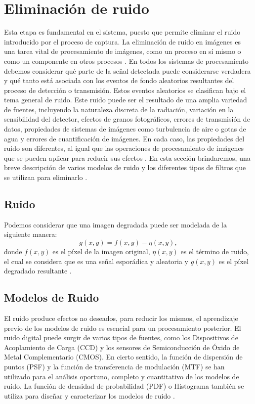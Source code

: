 \section{Eliminación de ruido}

Esta etapa es fundamental en el sistema, puesto que permite eliminar el ruido introducido por el proceso de captura. La eliminación de ruido en imágenes es una tarea vital de procesamiento de imágenes, como un proceso en sí mismo o como un componente en otros procesos \cite{PawanManojSumitAshok}. En todos los sistemas de procesamiento debemos considerar qué parte de la señal detectada puede considerarse verdadera y qué tanto está asociada con los eventos de fondo aleatorios resultantes del proceso de detección o transmisión. Estos eventos aleatorios se clasifican bajo el tema general de ruido. Este ruido puede ser el resultado de una amplia variedad de fuentes, incluyendo la naturaleza discreta de la radiación, variación en la sensibilidad del detector, efectos de granos fotográficos, errores de transmisión de datos, propiedades de sistemas de imágenes como turbulencia de aire o gotas de agua y errores de cuantificación de imágenes. En cada caso, las propiedades del ruido son diferentes, al igual que las operaciones de procesamiento de imágenes que se pueden aplicar para reducir sus efectos \cite{topic5}. En esta sección brindaremos, una breve descripción de varios modelos de ruido \cite{AjayBrijendra} y los diferentes tipos de filtros que se utilizan para eliminarlo \cite{MandarMeghana, PawanManojSumitAshok}.

\subsection{Ruido}

Podemos considerar que una imagen degradada puede ser modelada de la siguiente manera:
$$g(x, y) = f(x, y) - \eta(x, y),$$
donde $f(x, y)$ es el píxel de la imagen original, $\eta(x, y)$ es el término de ruido, el cual se considera que es una señal esporádica y aleatoria y $g(x, y)$ es el píxel degradado resultante \cite{MandarMeghana}.

\subsection{Modelos de Ruido}

El ruido produce efectos no deseados, para reducir los mismos, el aprendizaje previo de los modelos de ruido es esencial para un procesamiento posterior. El ruido digital puede surgir de varios tipos de fuentes, como los Dispositivos de Acoplamiento de Carga (CCD) y los sensores de Semiconducción de Óxido de Metal Complementario (CMOS). En cierto sentido, la función de dispersión de puntos (PSF) y la función de transferencia de modulación (MTF) se han utilizado para el análisis oportuno, completo y cuantitativo de los modelos de ruido. La función de densidad de probabilidad (PDF) o Histograma también se utiliza para diseñar y caracterizar los modelos de ruido \cite{AjayBrijendra,Dougherty}.\\


